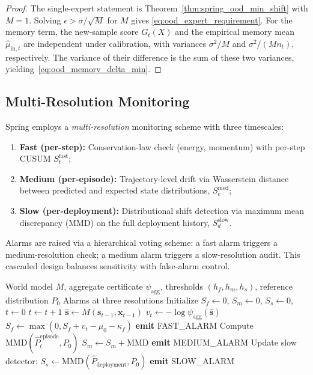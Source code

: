 \documentclass[11pt,twocolumn]{article}
\theoremstyle{definition}
\begin{document}
\begin{proof}
The single-expert statement is Theorem~\ref{thm:spring_ood_min_shift} with
$M=1$.  Solving $\epsilon>\sigma/\sqrt{M}$ for $M$ gives
\eqref{eq:ood_expert_requirement}.  For the memory term, the new-sample score
$G_t(X)$ and the empirical memory mean $\widehat{\mu}_{\mathrm{in},t}$ are
independent under calibration, with variances $\sigma^2/M$ and
$\sigma^2/(Mn_t)$, respectively.  The variance of their difference is the sum
of these two variances, yielding~\eqref{eq:ood_memory_delta_min}.
\end{proof}

\subsection{Multi-Resolution Monitoring}

Spring employs a \emph{multi-resolution} monitoring scheme with three
timescales:

\begin{enumerate}[leftmargin=*,nosep]
  \item \textbf{Fast (per-step):} Conservation-law check (energy, momentum)
    with per-step CUSUM $S_t^{\text{fast}}$;
  \item \textbf{Medium (per-episode):} Trajectory-level drift via
    Wasserstein distance between predicted and expected state distributions,
    $S_e^{\text{med}}$;
  \item \textbf{Slow (per-deployment):} Distributional shift detection via
    maximum mean discrepancy (MMD) on the full deployment history,
    $S_d^{\text{slow}}$.
\end{enumerate}

Alarms are raised via a hierarchical voting scheme: a fast alarm triggers a
medium-resolution check; a medium alarm triggers a slow-resolution audit.
This cascaded design balances sensitivity with false-alarm control.

\begin{algorithm}[t]
\caption{Spring Online Drift Monitor}
\label{alg:spring}
\begin{algorithmic}[1]
\Require World model $M$, aggregate certificate $\psi_{\text{agg}}$,
         thresholds $(h_f, h_m, h_s)$, reference distribution $P_0$
\Ensure Alarms at three resolutions
\State Initialize $S_f \gets 0$, $S_m \gets 0$, $S_s \gets 0$, $t \gets 0$
  \State $t \gets t + 1$
  \State $\hat{\mathbf{s}} \gets M(\mathbf{s}_{t-1}, \mathbf{x}_{t-1})$
  \State $v_t \gets -\log \psi_{\text{agg}}(\hat{\mathbf{s}})$
  \State $S_f \gets \max(0, S_f + v_t - \mu_0 - \kappa_f)$
    \State \textbf{emit} FAST\_ALARM
    \State Compute $\text{MMD}(\hat{P}_t^{\text{episode}}, P_0)$
    \State $S_m \gets S_m + \text{MMD}$
     \textbf{emit} MEDIUM\_ALARM \EndIf
  \EndIf
    \State Update slow detector: $S_s \gets \text{MMD}(\hat{P}_{\text{deployment}}, P_0)$
     \textbf{emit} SLOW\_ALARM \EndIf
  \EndIf
\EndFor
\end{algorithmic}
\end{algorithm}
\end{document}
